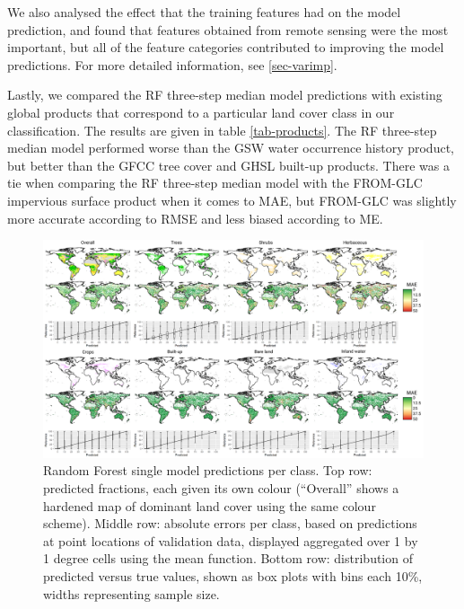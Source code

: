 \documentclass[review,authoryear,3p]{elsarticle}
\begin{document}
We also analysed the effect that the training features had on the model prediction, and found that features obtained from remote sensing were the most important, but all of the feature categories contributed to improving the model predictions.
For more detailed information, see \ref{sec-varimp}.

Lastly, we compared the \gls{RF} three-step median model predictions with existing global products that correspond to a particular land cover class in our classification.
The results are given in table \ref{tab-products}.
The \gls{RF} three-step median model performed worse than the \gls{GSW} water occurrence history product, but better than the \gls{GFCC} tree cover and \gls{GHSL} built-up products.
There was a tie when comparing the \gls{RF} three-step median model with the \gls{FROM-GLC} impervious surface product when it comes to \gls{MAE}, but \gls{FROM-GLC} was slightly more accurate according to \gls{RMSE} and less biased according to \gls{ME}.

\begin{figure}
    \centering
    \includegraphics[width=\textwidth]{article-figures/maps/2020-10-12-walltowall.png}
    \caption{Random Forest single model predictions per class. Top row: predicted fractions, each given its own colour (``Overall'' shows a hardened map of dominant land cover using the same colour scheme). Middle row: absolute errors per class, based on predictions at point locations of validation data, displayed aggregated over 1 by 1 degree cells using the mean function. Bottom row: distribution of predicted versus true values, shown as box plots with bins each 10\%, widths representing sample size.}
    \label{fig-walltowall}
\end{figure}
\end{document}
